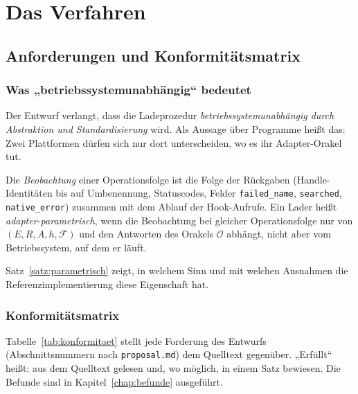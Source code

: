 \part{Das Verfahren}

\chapter{Anforderungen und Konformitätsmatrix}
\label{chap:anforderungen}

\section{Was „betriebssystemunabhängig“ bedeutet}

Der Entwurf verlangt, dass die Ladeprozedur \emph{betriebssystemunabhängig durch Abstraktion und Standardisierung} wird. Als Aussage über Programme heißt das: Zwei Plattformen dürfen sich nur dort unterscheiden, wo es ihr Adapter-Orakel tut.

\begin{definition}
	\label{def:parametrizitaet}
	Die \emph{Beobachtung} einer Operationsfolge ist die Folge der Rückgaben (Handle-Identitäten bis auf Umbenennung, Statuscodes, Felder \texttt{failed\_name}, \texttt{searched}, \texttt{native\_error}) zusammen mit dem Ablauf der Hook-Aufrufe. Ein Lader heißt \emph{adapter-parametrisch}, wenn die Beobachtung bei gleicher Operationsfolge nur von $(E,R,A,h,\mathcal{F})$ und den Antworten des Orakels $\mathcal{O}$ abhängt, nicht aber vom Betriebssystem, auf dem er läuft.
\end{definition}

Satz~\ref{satz:parametrisch} zeigt, in welchem Sinn und mit welchen Ausnahmen die Referenzimplementierung diese Eigenschaft hat.

\section{Konformitätsmatrix}

Tabelle~\ref{tab:konformitaet} stellt jede Forderung des Entwurfs (Abschnittsnummern nach \texttt{proposal.md}) dem Quelltext gegenüber. „Erfüllt“ heißt: aus dem Quelltext gelesen und, wo möglich, in einem Satz bewiesen. Die Befunde sind in Kapitel~\ref{chap:befunde} ausgeführt.

